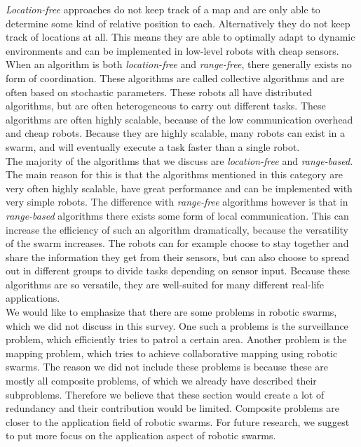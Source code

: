 \emph{Location-free} approaches do not keep track of a map and are only able to determine some kind of relative position to each.
Alternatively they do not keep track of locations at all.
This means they are able to optimally adapt to dynamic environments and can be implemented in low-level robots with cheap sensors.\\

When an algorithm is both \emph{location-free} and \emph{range-free}, there generally exists no form of coordination.
These algorithms are called collective algorithms and are often based on stochastic parameters.
These robots all have distributed algorithms, but are often heterogeneous to carry out different tasks.
These algorithms are often highly scalable, because of the low communication overhead and cheap robots. 
Because they are highly scalable, many robots can exist in a swarm, and will eventually execute a task faster than a single robot.\\

The majority of the algorithms that we discuss are \emph{location-free} and \emph{range-based}.
The main reason for this is that the algorithms mentioned in this category are very often highly scalable, have great performance and can be implemented with very simple robots.
The difference with \emph{range-free} algorithms however is that in \emph{range-based} algorithms there exists some form of local communication.
This can increase the efficiency of such an algorithm dramatically, because the versatility of the swarm increases.
The robots can for example choose to stay together and share the information they get from their sensors, but can also choose to spread out in different groups to divide tasks depending on sensor input.
Because these algorithms are so versatile, they are well-suited for many different real-life applications.\\

We would like to emphasize that there are some problems in robotic swarms, which we did not discuss in this survey.
One such a problems is the surveillance problem, which efficiently tries to patrol a certain area.
Another problem is the mapping problem, which tries to achieve collaborative mapping using robotic swarms.
The reason we did not include these problems is because these are mostly all composite problems, of which we already have described their subproblems.
Therefore we believe that these section would create a lot of redundancy and their contribution would be limited.
Composite problems are closer to the application field of robotic swarms.
For future research, we suggest to put more focus on the application aspect of robotic swarms.

